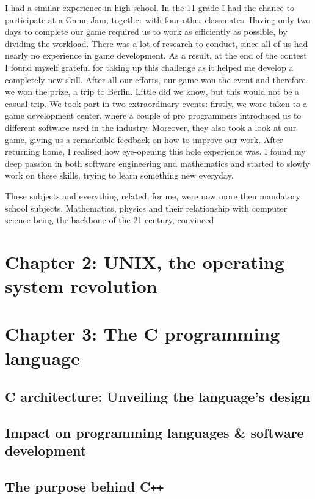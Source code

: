 \documentclass[12pt]{article}
\newcommand\textss[1]{\stackengine{.9ex}{}{\scriptsize#1}{O}{l}{F}{F}{L}}
\begin{document}
I had a similar experience in high school. In the 11\textss{th} grade I had the chance to participate at a Game Jam, together with four other classmates. Having only two days to complete our game required us to work as efficiently as possible, by dividing the workload. There was a lot of research to conduct, since all of us had nearly no experience in game development. As a result, at the end of the contest I found myself grateful for taking up this challenge as it helped me develop a completely new skill. After all our efforts, our game won the event and therefore we won the prize, a trip to Berlin. Little did we know, but this would not be a casual trip. We took part in two extraordinary events: firstly, we wore taken to a game development center, where a couple of pro programmers introduced us to different software used in the industry. Moreover, they also took a look at our game, giving us a remarkable feedback on how to improve our work. After returning home, I realised how eye-opening this hole experience was. I found my deep passion in both software engineering and mathematics and started to slowly work on these skills, trying to learn something new everyday.\newline

These subjects and everything related, for me, were now more then mandatory school subjects. Mathematics, physics and their relationship with computer science being the backbone of the 21\textss{st} century, convinced 

\newpage
\section{Chapter 2: UNIX, the operating system revolution}

\newpage
\section{Chapter 3: The C programming language}
\subsection{C architecture: Unveiling the language's design}

\newpage
\subsection{Impact on programming languages \& software development}

\newpage
\subsection{The purpose behind C\texttt{++}}
\end{document}
